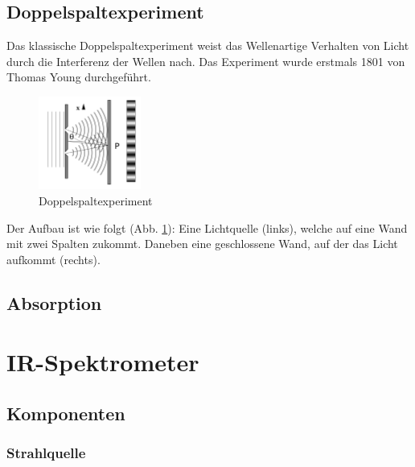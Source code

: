 \documentclass{article}
\begin{document}
\newpage
\subsection{Doppelspaltexperiment}

Das klassische Doppelspaltexperiment weist das Wellenartige Verhalten von Licht durch die Interferenz der Wellen nach.
Das Experiment wurde erstmals 1801 von Thomas Young durchgeführt.

\begin{figure}
    \centering
    \includegraphics[width=0.3\textwidth]{doppelspalt.png}
    \caption{Doppelspaltexperiment}
    \label{fig:doppelspalt}
\end{figure}
Der Aufbau ist wie folgt (Abb. \ref{fig:doppelspalt}): Eine Lichtquelle (links), welche auf eine Wand mit zwei Spalten zukommt. Daneben eine geschlossene Wand, auf der das Licht aufkommt (rechts).


\newpage
\subsection{Absorption}


\section{IR-Spektrometer}


\subsection{Komponenten}

\subsubsection{Strahlquelle}

\end{document}
